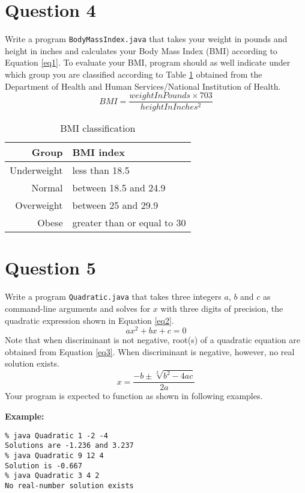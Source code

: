 \documentclass[12pt,letterpaper,twoside]{article}
\begin{document}
\section*{Question 4}

Write a program \texttt{BodyMassIndex.java} that takes your weight in pounds and height in inches and calculates your Body Mass Index (BMI) according to Equation \ref{eq1}. To evaluate your BMI, program should as well indicate under which group you are classified according to Table \ref{tab1} obtained from the Department of Health and Human Services/National Institution of Health.
\begin{equation}
BMI = \frac{weightInPounds \times 703}{heightInInches^2}
\label{eq1}
\end{equation}
\begin{table}[H]\centering
\begin{tabular}{|r|l|}
\hline
Group & BMI index \\
\hline
Underweight & less than 18.5 \\
Normal & between 18.5 and 24.9 \\
Overweight & between 25 and 29.9 \\
Obese & greater than or equal to 30 \\
\hline
\end{tabular}
\caption{BMI classification}\label{tab1}
\end{table}
\newpage

\section*{Question 5}

Write a program \texttt{Quadratic.java} that takes three integers $a$, $b$ and $c$ as command-line arguments and solves for $x$ with three digits of precision, the quadratic expression shown in Equation \ref{eq2}.
\begin{equation}
ax^2+bx+c=0
\label{eq2}
\end{equation}
Note that when discriminant is not negative, root(s) of a quadratic equation are obtained from Equation \ref{eq3}. When discriminant is negative, however, no real solution exists.
\begin{equation}
x = \frac{-b \pm \sqrt[2]{b^2-4ac}}{2a}
\label{eq3}
\end{equation}
Your program is expected to function as shown in following examples.

\textbf{Example:}
\begin{verbatim}
% java Quadratic 1 -2 -4
Solutions are -1.236 and 3.237
% java Quadratic 9 12 4
Solution is -0.667
% java Quadratic 3 4 2
No real-number solution exists
\end{verbatim}

\end{document}
